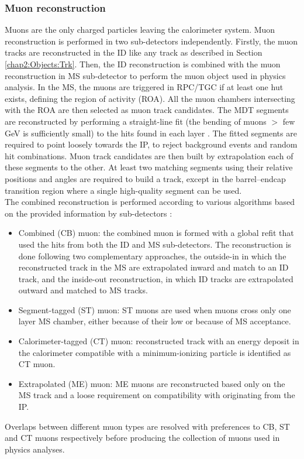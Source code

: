 \subsubsection{Muon reconstruction}
\label{chap2:Objects:Muon:Reco}
Muons are the only charged particles leaving the calorimeter system. Muon reconstruction is performed in two sub-detectors independently. Firstly, the muon tracks are reconstructed in the ID like any track as described in Section \ref{chap2:Objects:Trk}. Then, the ID reconstruction is combined with the muon reconstruction in MS sub-detector to perform the muon object used in physics analysis. In the MS, the muons are triggered in RPC/TGC if at least one hut exists, defining the region of activity (ROA). All the muon chambers intersecting with the ROA are then selected as muon track candidates. The MDT segments are reconstructed by performing a straight-line fit (the bending of muons $>$ few GeV is sufficiently small) to the hits found in each layer \cite{hough}. The fitted segments are required to point loosely towards the IP, to reject background events and random hit combinations. Muon track candidates are then built by extrapolation each of these segments to the other. At least two matching segments using their relative positions and angles are required to build a track, except in the barrel–endcap transition region where a single high-quality segment can be used. \\
The combined reconstruction is performed according to various algorithms based on the provided information by sub-detectors \cite{Muon_Reco_2014_algo,Muon_Reco_2016_algo}: 
\begin{itemize}
    \item Combined (CB) muon: the combined muon is formed with a global refit that used the hits from both the ID and MS sub-detectors. The reconstruction is done following two complementary approaches, the outside-in in which the reconstructed track in the MS are extrapolated inward and match to an ID track, and the inside-out reconstruction, in which ID tracks are extrapolated outward and matched to MS tracks.
    \item Segment-tagged (ST) muon: ST muons are used when muons cross only one layer MS chamber, either because of their low \pT or because of MS acceptance. 
    \item Calorimeter-tagged (CT) muon: reconstructed track with an energy deposit in the calorimeter compatible with a minimum-ionizing particle is identified as CT muon. 
    \item Extrapolated (ME) muon: ME muons are reconstructed based only on the MS track and a loose requirement on compatibility with originating from the IP. 
\end{itemize}
Overlaps between different muon types are resolved with preferences to CB, ST and CT muons respectively before producing the collection of muons used in physics analyses.

